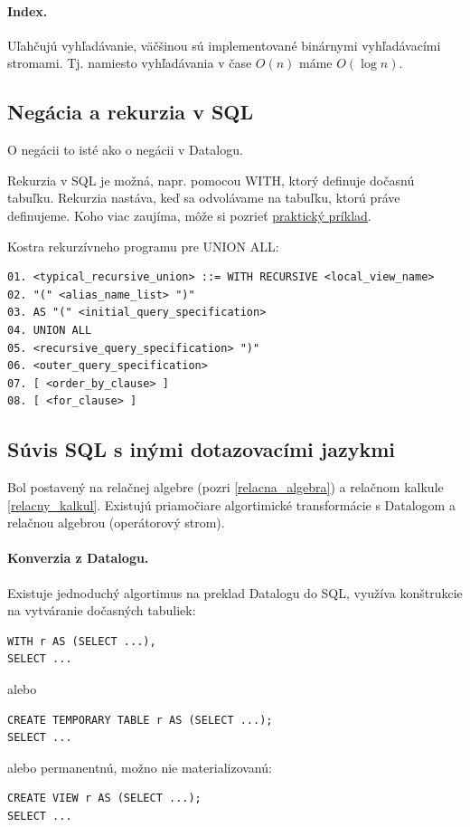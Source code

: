\documentclass[10pt,a4paper]{article}
\begin{document}
\paragraph{Index.}
Uľahčujú vyhľadávanie, väčšinou sú implementované binárnymi vyhľadávacími stromami.
Tj. namiesto vyhľadávania v čase $O(n)$ máme $O(\log n)$.

\subsection{Negácia a rekurzia v SQL}

O negácii to isté ako o negácii v Datalogu.

Rekurzia v SQL je možná, napr. pomocou WITH, ktorý definuje dočasnú tabuľku. Rekurzia nastáva, keď sa odvolávame na tabuľku, ktorú práve definujeme. Koho viac zaujíma, môže si pozrieť \href{http://sqlanywhere.blogspot.sk/2012/04/example-recursive-union.html}{praktický príklad}.

Kostra rekurzívneho programu pre UNION ALL:
\begin{verbatim}
01. <typical_recursive_union> ::= WITH RECURSIVE <local_view_name>
02. "(" <alias_name_list> ")"
03. AS "(" <initial_query_specification>
04. UNION ALL
05. <recursive_query_specification> ")"
06. <outer_query_specification>
07. [ <order_by_clause> ]
08. [ <for_clause> ]
\end{verbatim}

\subsection{Súvis SQL s inými dotazovacími jazykmi}

Bol postavený na relačnej algebre (pozri \ref{relacna_algebra}) a relačnom kalkule \ref{relacny_kalkul}. Existujú priamočiare algortimické transformácie s Datalogom a relačnou algebrou (operátorový strom).

\paragraph{Konverzia z Datalogu.}
Existuje jednoduchý algortimus na preklad Datalogu do SQL,
využíva konštrukcie na vytváranie dočasných tabuliek:
\begin{verbatim}
WITH r AS (SELECT ...),
SELECT ...
\end{verbatim}
alebo
\begin{verbatim}
CREATE TEMPORARY TABLE r AS (SELECT ...);
SELECT ...
\end{verbatim}
alebo permanentnú, možno nie materializovanú:
\begin{verbatim}
CREATE VIEW r AS (SELECT ...);
SELECT ...
\end{verbatim}
\end{document}
